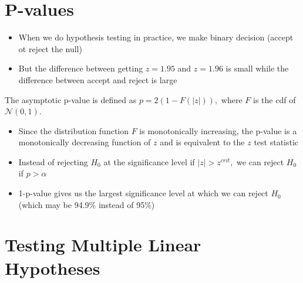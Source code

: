 \documentclass[notes=show]{beamer}
\begin{document}
\section{P-values}

\begin{frame}%


\begin{itemize}
\item When we do hypothesis testing in practice, we make binary decision
(accept ot reject the null)

\item But the difference between getting $z=1.95$ and $z=1.96$ is small
while the difference between accept and reject is large
\end{itemize}

\begin{definition}
The asymptotic p-value is defined as $p=2\left( 1-F\left( \left\vert
z\right\vert \right) \right) ,$ where $F$ is the cdf of $\mathcal{N}\left(
0,1\right) .$
\end{definition}

\begin{itemize}
\item Since the distribution function $F$ is monotonically increasing, the
p-value is a monotonically decreasing function of $z$ and is equivalent to
the $z$ test statistic

\item Instead of rejecting $H_{0}$ at the significance level if $\left\vert
z\right\vert >z^{crit},$ we can reject $H_{0}$ if $p>\alpha $

\item 1-p-value gives us the largest significance level at which we can
reject $H_{0}$ (which may be 94.9\% instead of 95\%)
\end{itemize}

\end{frame}%

\section{Testing Multiple Linear Hypotheses}
\end{document}
